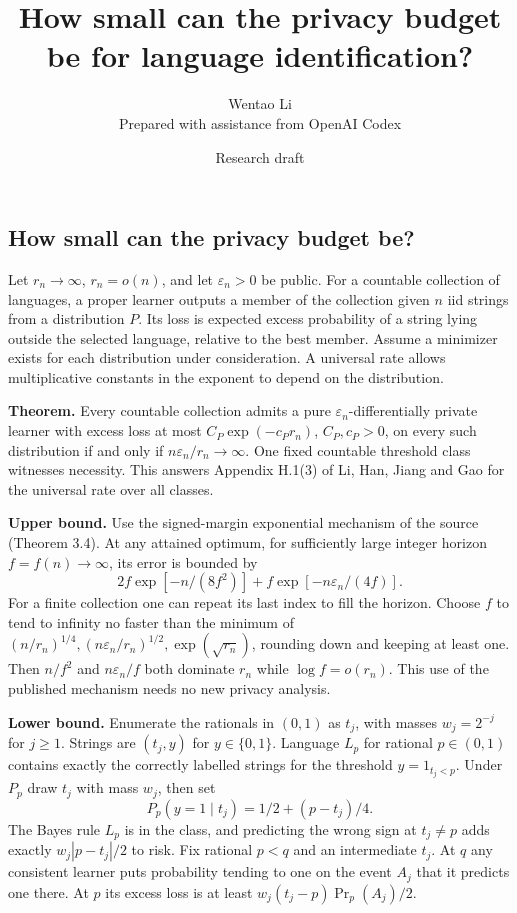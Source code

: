 \documentclass[11pt]{article}
\title{How small can the privacy budget be for language identification?}
\author{Wentao Li\\{\small Prepared with assistance from OpenAI Codex}}
\date{Research draft}
\begin{document}
\maketitle
\subsection{How small can the privacy budget be?}\label{how-small-can-the-privacy-budget-be}

Let \(r_n\to\infty\), \(r_n=o(n)\), and let \(\varepsilon_n>0\) be public. For a countable collection of languages, a proper learner outputs a member of the collection given \(n\) iid strings from a distribution \(P\). Its loss is expected excess probability of a string lying outside the selected language, relative to the best member. Assume a minimizer exists for each distribution under consideration. A universal rate allows multiplicative constants in the exponent to depend on the distribution.

\textbf{Theorem.} Every countable collection admits a pure \(\varepsilon_n\)-differentially private learner with excess loss at most \(C_P\exp(-c_P r_n)\), \(C_P,c_P>0\), on every such distribution if and only if \(n\varepsilon_n/r_n\to\infty\). One fixed countable threshold class witnesses necessity. This answers Appendix H.1(3) of Li, Han, Jiang and Gao for the universal rate over all classes.

\textbf{Upper bound.} Use the signed-margin exponential mechanism of the source (Theorem 3.4). At any attained optimum, for sufficiently large integer horizon \(f=f(n)\to\infty\), its error is bounded by
\[2f\exp[-n/(8f^2)]+ f\exp[-n\varepsilon_n/(4f)].\]
For a finite collection one can repeat its last index to fill the horizon. Choose \(f\) to tend to infinity no faster than the minimum of \((n/r_n)^{1/4},(n\varepsilon_n/r_n)^{1/2},\exp(\sqrt{r_n})\), rounding down and keeping at least one. Then \(n/f^2\) and \(n\varepsilon_n/f\) both dominate \(r_n\) while \(\log f=o(r_n)\). This use of the published mechanism needs no new privacy analysis.

\textbf{Lower bound.} Enumerate the rationals in \((0,1)\) as \(t_j\), with masses \(w_j=2^{-j}\) for \(j\ge1\). Strings are \((t_j,y)\) for \(y\in\{0,1\}\). Language \(L_p\) for rational \(p\in(0,1)\) contains exactly the correctly labelled strings for the threshold \(y=1_{t_j<p}\). Under \(P_p\) draw \(t_j\) with mass \(w_j\), then set
\[P_p(y=1\mid t_j)=1/2+(p-t_j)/4.\]
The Bayes rule \(L_p\) is in the class, and predicting the wrong sign at \(t_j\ne p\) adds exactly \(w_j|p-t_j|/2\) to risk. Fix rational \(p<q\) and an intermediate \(t_j\). At \(q\) any consistent learner puts probability tending to one on the event \(A_j\) that it predicts one there. At \(p\) its excess loss is at least \(w_j(t_j-p)\Pr_p(A_j)/2\).
\end{document}
